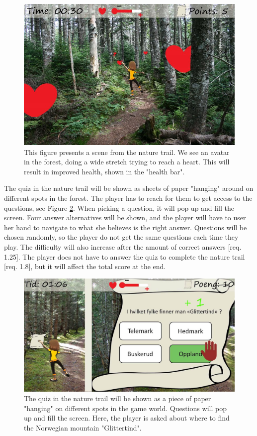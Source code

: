 \begin{figure} [H]
\centering
\includegraphics[scale=0.45]{game1engelsk.jpg}
\caption[Nature trail - stretching]{This figure presents a scene from the nature trail. We see an avatar in the forest, doing a wide stretch trying to reach a heart. This will result in improved health, shown in the "health bar".}
\label{fig:hearts}
\end{figure}

The quiz in the nature trail will be shown as sheets of paper "hanging" around on different spots in the forest. The player has to reach for them to get access to the questions, see Figure \ref{fig:quiz}. When picking a question, it will pop up and fill the screen. Four answer alternatives will be shown, and the player will have to user her hand to navigate to what she believes is the right answer. Questions will be chosen randomly, so the player do not get the same questions each time they play. The difficulty will also increase after the amount of correct answers [req. 1.25]. The player does not have to answer the quiz to complete the nature trail [req. 1.8], but it will affect the total score at the end. 

\begin{figure} [H]
\centering
\includegraphics[scale=0.5]{quiz.jpg}
\caption[Nature trail - quiz]{The quiz in the nature trail will be shown as a piece of paper "hanging" on different spots in the game world. Questions will pop up and fill the screen. Here, the player is asked about where to find the Norwegian mountain "Glittertind".}
\label{fig:quiz}
\end{figure} 

